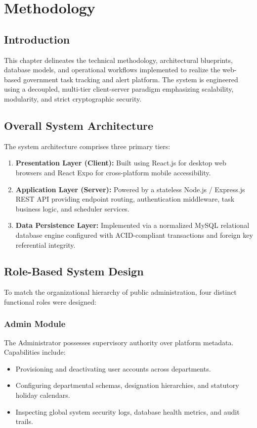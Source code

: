 \chapter{Methodology}
\label{ch:methodology}

\section{Introduction}
\label{sec:meth_intro}
This chapter delineates the technical methodology, architectural blueprints, database models, and operational workflows implemented to realize the web-based government task tracking and alert platform. The system is engineered using a decoupled, multi-tier client-server paradigm emphasizing scalability, modularity, and strict cryptographic security.

\section{Overall System Architecture}
\label{sec:system_architecture}
The system architecture comprises three primary tiers:
\begin{enumerate}
    \item \textbf{Presentation Layer (Client):} Built using React.js for desktop web browsers and React Expo for cross-platform mobile accessibility.
    \item \textbf{Application Layer (Server):} Powered by a stateless Node.js / Express.js REST API providing endpoint routing, authentication middleware, task business logic, and scheduler services.
    \item \textbf{Data Persistence Layer:} Implemented via a normalized MySQL relational database engine configured with ACID-compliant transactions and foreign key referential integrity.
\end{enumerate}

\section{Role-Based System Design}
\label{sec:rbac_design}
To match the organizational hierarchy of public administration, four distinct functional roles were designed:

\subsection{Admin Module}
The Administrator possesses supervisory authority over platform metadata. Capabilities include:
\begin{itemize}
    \item Provisioning and deactivating user accounts across departments.
    \item Configuring departmental schemas, designation hierarchies, and statutory holiday calendars.
    \item Inspecting global system security logs, database health metrics, and audit trails.
\end{itemize}

